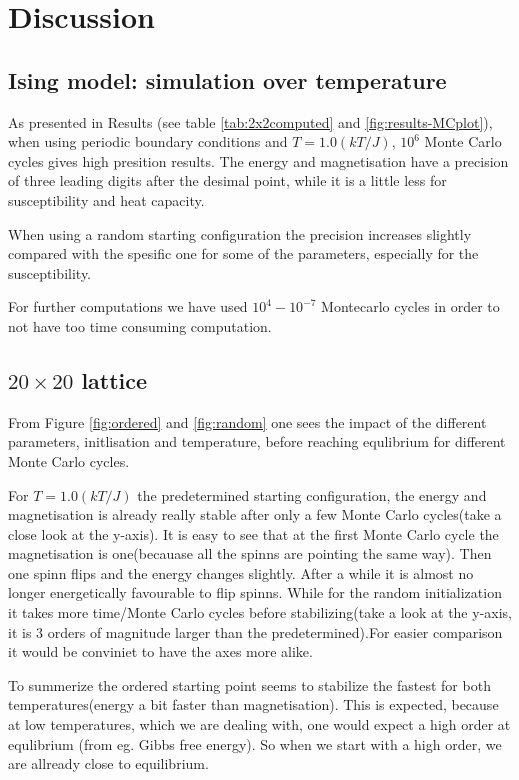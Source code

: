 \documentclass[../main.tex]{subfiles}
\begin{document}
\section{Discussion}

\subsection{Ising model: simulation over temperature}

As presented in Results (see table \ref{tab:2x2computed} and \ref{fig:results-MCplot}), when using periodic boundary conditions and $T = 1.0(kT/J)$, $10^6$ Monte Carlo cycles gives high presition results. The energy and magnetisation have a precision of three leading digits after the desimal point, while it is a little less for susceptibility and heat capacity.

When using a random starting configuration the precision increases slightly compared with the spesific one for some of the parameters, especially for the susceptibility.

For further computations we have used $10^4 - 10^{-7}$ Montecarlo cycles in order to not have too time consuming computation.

\subsection{$20 \times 20$ lattice}

From Figure \ref{fig:ordered} and \ref{fig:random} one sees the impact of the different parameters, initlisation and temperature, before reaching equlibrium for different Monte Carlo cycles.

For $T=1.0(kT/J)$ the predetermined starting configuration, the energy and magnetisation is already really stable after only a few Monte Carlo cycles(take a close look at the y-axis). It is easy to see that at the first Monte Carlo cycle the magnetisation is one(becauase all the spinns are pointing the same way). Then one spinn flips and the energy changes slightly. After a while it is almost no longer energetically favourable to flip spinns.
While for the random initialization it takes more time/Monte Carlo cycles before stabilizing(take a look at the y-axis, it is 3 orders of magnitude larger than the predetermined).For easier comparison it would be conviniet to have the axes more alike.

To summerize the ordered starting point seems to stabilize the fastest for both temperatures(energy a bit faster than magnetisation). This is expected, because at low temperatures, which we are dealing with, one would expect a high order at equlibrium (from eg. Gibbs free energy). So when we start with a high order, we are allready close to equilibrium.
\end{document}
